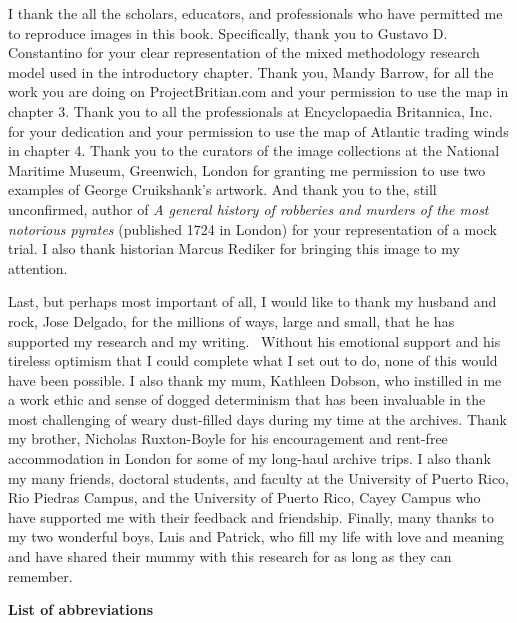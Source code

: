 \begin{styleStandard}
I thank the all the scholars, educators, and professionals who have permitted me to reproduce images in this book. Specifically, thank you to Gustavo D. Constantino for your clear representation of the mixed methodology research model used in the introductory chapter. Thank you, Mandy Barrow, for all the work you are doing on ProjectBritian.com and your permission to use the map in chapter 3. Thank you to all the professionals at Encyclopaedia Britannica, Inc. for your dedication and your permission to use the map of Atlantic trading winds in chapter 4. Thank you to the curators of the image collections at the National Maritime Museum, Greenwich, London for granting me permission to use two examples of George Cruikshank’s artwork. And thank you to the, still unconfirmed, author of \textit{A general history of robberies and murders of the most notorious pyrates }(published 1724 in London) for your representation of a mock trial. I also thank historian Marcus Rediker for bringing this image to my attention. 
\end{styleStandard}


\begin{styleStandard}
Last, but perhaps most important of all, I would like to thank my husband and rock, Jose Delgado, for the millions of ways, large and small, that he has supported my research and my writing. \ Without his emotional support and his tireless optimism that I could complete what I set out to do, none of this would have been possible. I also thank my mum, Kathleen Dobson, who instilled in me a work ethic and sense of dogged determinism that has been invaluable in the most challenging of weary dust-filled days during my time at the archives. Thank my brother, Nicholas Ruxton-Boyle for his encouragement and rent-free accommodation in London for some of my long-haul archive trips. I also thank my many friends, doctoral students, and faculty at the University of Puerto Rico, Rio Piedras Campus, and the University of Puerto Rico, Cayey Campus who have supported me with their feedback and friendship. Finally, many thanks to my two wonderful boys, Luis and Patrick, who fill my life with love and meaning and have shared their mummy with this research for as long as they can remember. 
\end{styleStandard}


\clearpage\begin{styleStandard}
\textbf{List of abbreviations}
\end{styleStandard}


